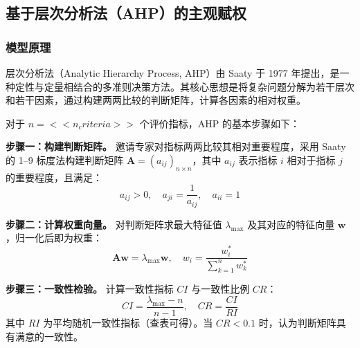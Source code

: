 
\subsection{基于层次分析法（AHP）的主观赋权}

\subsubsection{模型原理}

层次分析法（Analytic Hierarchy Process, AHP）由 Saaty 于 1977 年提出，是一种定性与定量相结合的多准则决策方法。其核心思想是将复杂问题分解为若干层次和若干因素，通过构建两两比较的判断矩阵，计算各因素的相对权重。

对于 $n=<< n_criteria >>$ 个评价指标，AHP 的基本步骤如下：

\textbf{步骤一：构建判断矩阵。} 邀请专家对指标两两比较其相对重要程度，采用 Saaty 的 1--9 标度法构建判断矩阵 $\mathbf{A} = (a_{ij})_{n \times n}$，其中 $a_{ij}$ 表示指标 $i$ 相对于指标 $j$ 的重要程度，且满足：
\begin{equation}
    a_{ij} > 0, \quad a_{ji} = \frac{1}{a_{ij}}, \quad a_{ii} = 1
    \label{eq:ahp_reciprocal}
\end{equation}

\textbf{步骤二：计算权重向量。} 对判断矩阵求最大特征值 $\lambda_{\max}$ 及其对应的特征向量 $\mathbf{w}$，归一化后即为权重：
\begin{equation}
    \mathbf{A} \mathbf{w} = \lambda_{\max} \mathbf{w}, \quad
    w_i = \frac{w_i^*}{\sum_{k=1}^{n} w_k^*}
    \label{eq:ahp_eigenvector}
\end{equation}

\textbf{步骤三：一致性检验。} 计算一致性指标 $CI$ 与一致性比例 $CR$：
\begin{equation}
    CI = \frac{\lambda_{\max} - n}{n - 1}, \quad
    CR = \frac{CI}{RI}
    \label{eq:ahp_consistency}
\end{equation}
其中 $RI$ 为平均随机一致性指标（查表可得）。当 $CR < 0.1$ 时，认为判断矩阵具有满意的一致性。

